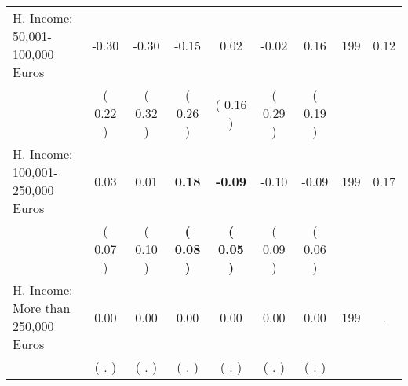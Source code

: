 \begin{tabular}{lcccccccc}
H. Income: 50,001-100,000 Euros &     -0.30 &     -0.30 &     -0.15 &      0.02 &     -0.02 &      0.16 & 199 &       0.12 \\ 
 & (     0.22 ) & (     0.32 ) & (     0.26 ) & (     0.16 ) & (     0.29 ) & (     0.19 ) & \\
H. Income: 100,001-250,000 Euros &      0.03 &      0.01 & \textbf{     0.18} & \textbf{    -0.09} &     -0.10 &     -0.09 & 199 &       0.17 \\ 
 & (     0.07 ) & (     0.10 ) & \textbf{(     0.08 )} & \textbf{(     0.05 )} & (     0.09 ) & (     0.06 ) & \\
H. Income: More than 250,000 Euros &      0.00 &      0.00 &      0.00 &      0.00 &      0.00 &      0.00 & 199 &          . \\ 
 & (        . ) & (        . ) & (        . ) & (        . ) & (        . ) & (        . ) & \\
\bottomrule
\end{tabular}
